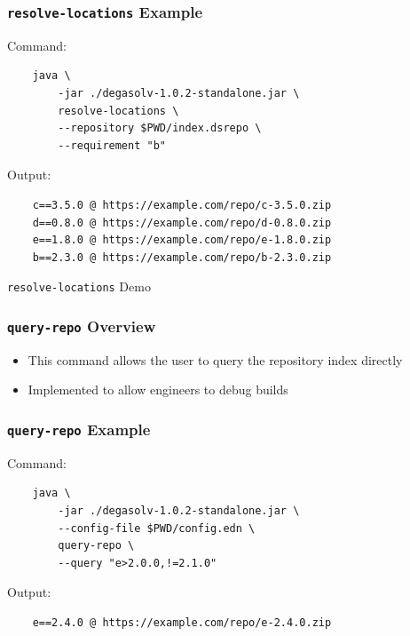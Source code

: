 \documentclass{beamer}
\begin{document}
\begin{frame}[fragile]
  \frametitle{\texttt{resolve-locations} Example}
  Command:
\begin{verbatim}
    java \
        -jar ./degasolv-1.0.2-standalone.jar \
        resolve-locations \
        --repository $PWD/index.dsrepo \
        --requirement "b"
\end{verbatim}
  Output:
\begin{verbatim}
    c==3.5.0 @ https://example.com/repo/c-3.5.0.zip
    d==0.8.0 @ https://example.com/repo/d-0.8.0.zip
    e==1.8.0 @ https://example.com/repo/e-1.8.0.zip
    b==2.3.0 @ https://example.com/repo/b-2.3.0.zip
\end{verbatim}
\end{frame}
\begin{frame}
  \centerline{\color{blue}\Large \texttt{resolve-locations} Demo}
\end{frame}

\begin{frame}
  \frametitle{\texttt{query-repo} Overview}
  \begin{itemize}
  \item This command allows the user to query the repository index directly
  \item Implemented to allow engineers to debug builds
  \end{itemize}
\end{frame}
\begin{frame}[fragile]
  \frametitle{\texttt{query-repo} Example}
  Command:
\begin{verbatim}
    java \
        -jar ./degasolv-1.0.2-standalone.jar \
        --config-file $PWD/config.edn \
        query-repo \
        --query "e>2.0.0,!=2.1.0"
\end{verbatim}
  Output:
\begin{verbatim}
    e==2.4.0 @ https://example.com/repo/e-2.4.0.zip
\end{verbatim}
\end{frame}
\end{document}
